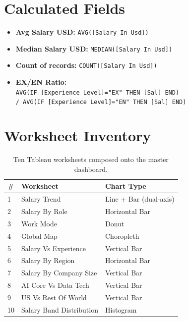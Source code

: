 \documentclass[11pt,a4paper,oneside]{report}
\begin{document}
\section{Calculated Fields}
\begin{itemize}
    \item \textbf{Avg Salary USD:} \texttt{AVG([Salary In Usd])}
    \item \textbf{Median Salary USD:} \texttt{MEDIAN([Salary In Usd])}
    \item \textbf{Count of records:} \texttt{COUNT([Salary In Usd])}
    \item \textbf{EX/EN Ratio:} \\
          \texttt{AVG(IF [Experience Level]="EX" THEN [Sal] END)} \\
          \texttt{/ AVG(IF [Experience Level]="EN" THEN [Sal] END)}
\end{itemize}

\section{Worksheet Inventory}
\begin{table}[H]
    \centering
    \begin{tabular}{lll}
        \toprule
        \textbf{\#} & \textbf{Worksheet} & \textbf{Chart Type} \\
        \midrule
        1 & Salary Trend & Line + Bar (dual-axis) \\
        2 & Salary By Role & Horizontal Bar \\
        3 & Work Mode & Donut \\
        4 & Global Map & Choropleth \\
        5 & Salary Vs Experience & Vertical Bar \\
        6 & Salary By Region & Horizontal Bar \\
        7 & Salary By Company Size & Vertical Bar \\
        8 & AI Core Vs Data Tech & Vertical Bar \\
        9 & US Vs Rest Of World & Vertical Bar \\
        10 & Salary Band Distribution & Histogram \\
        \bottomrule
    \end{tabular}
    \caption{Ten Tableau worksheets composed onto the master dashboard.}
\end{table}
\end{document}
